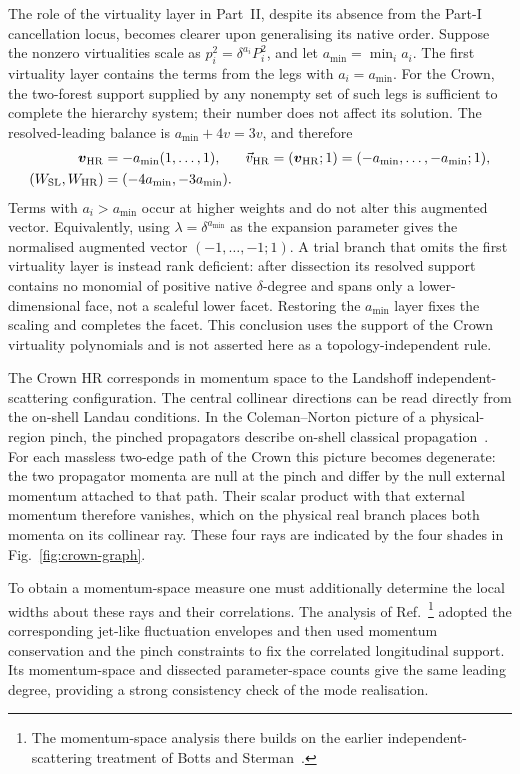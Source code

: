 \documentclass[a4paper,11pt]{article}
\newcommand{\HR}{\mathrm{HR}}
\newcommand{\WSL}{W_{\rm SL}}
\newcommand{\WHR}{W_{\rm HR}}
\newcommand{\vHR}{\vec v_{\rm HR}}
\begin{document}
The role of the virtuality layer in Part~II, despite its absence from the
Part-I cancellation locus, becomes clearer upon generalising its native
order.  Suppose the nonzero virtualities scale as
\(p_i^2=\delta^{a_i}P_i^2\), and let
\(a_{\min}=\min_i a_i\).  The first virtuality layer contains the terms from
the legs with \(a_i=a_{\min}\).  For the Crown, the two-forest support supplied
by any nonempty set of such legs is sufficient to complete the hierarchy
system; their number does not affect its solution.  The resolved-leading
balance is \(a_{\min}+4v=3v\), and therefore
\begin{equation*}
\begin{aligned}
 \boldsymbol v_{\HR}&=-a_{\min}(1,\ldots,1),
 &\vHR&=(\boldsymbol v_{\HR};1)
       =(-a_{\min},\ldots,-a_{\min};1),\\
 (\WSL,\WHR)&=(-4a_{\min},-3a_{\min}).
\end{aligned}
\end{equation*}
Terms with \(a_i>a_{\min}\) occur at higher weights and do not alter this
augmented vector.  Equivalently, using \(\lambda=\delta^{a_{\min}}\) as the
expansion parameter gives the normalised augmented vector
\((-1,\ldots,-1;1)\).  A trial branch that omits the first virtuality layer is
instead rank deficient: after dissection its resolved support contains no
monomial of positive native \(\delta\)-degree and spans only a lower-dimensional
face, not a scaleful lower facet.  Restoring the \(a_{\min}\) layer fixes the
scaling and completes the facet.  This conclusion uses the support of the
Crown virtuality polynomials and is not asserted here as a
topology-independent rule.

The Crown HR corresponds in momentum space to the Landshoff
independent-scattering configuration.  The central collinear directions can
be read directly from the on-shell Landau conditions.  In the
Coleman--Norton picture of a physical-region pinch, the pinched propagators
describe on-shell classical propagation~\cite{Coleman:1965cn,Collins:2020euz}.
For each massless two-edge path of the Crown this picture becomes degenerate:
the two propagator momenta are null at the pinch and differ by the null
external momentum attached to that path.  Their scalar product with that
external momentum therefore vanishes, which on the physical real branch
places both momenta on its collinear ray.  These four rays are indicated by
the four shades in Fig.~\ref{fig:crown-graph}.

To obtain a momentum-space measure one must additionally determine the local
widths about these rays and their correlations.  The analysis of
Ref.~\cite{Gardi:2024axt}\footnote{The momentum-space analysis there builds
on the earlier independent-scattering treatment of Botts and
Sterman~\cite{Botts:1989kf}.} adopted the corresponding jet-like fluctuation
envelopes and then used momentum conservation and the pinch constraints to
fix the correlated longitudinal support.  Its momentum-space and dissected
parameter-space counts give the same leading degree, providing a strong
consistency check of the mode realisation.
\end{document}
